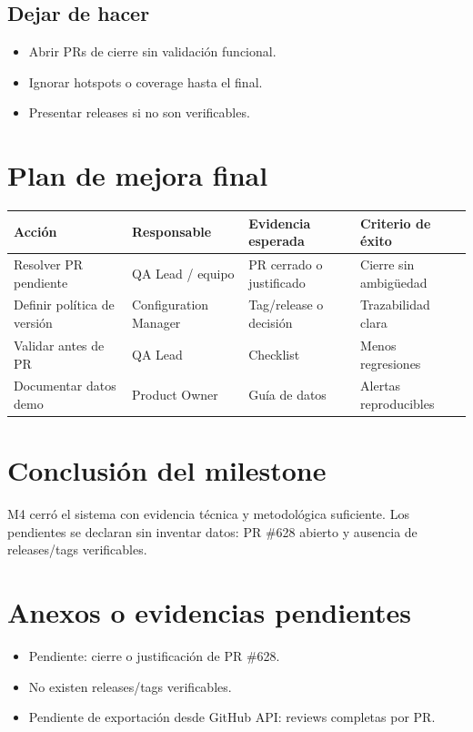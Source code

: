 \documentclass[11pt,a4paper]{article}
\begin{document}
\subsection{Dejar de hacer}
\begin{itemize}
\item Abrir PRs de cierre sin validación funcional.
\item Ignorar hotspots o coverage hasta el final.
\item Presentar releases si no son verificables.
\end{itemize}

\section{Plan de mejora final}
\begin{tabularx}{\linewidth}{Y Y Y Y}
\toprule
Acción & Responsable & Evidencia esperada & Criterio de éxito\\
\midrule
Resolver PR pendiente & QA Lead / equipo & PR cerrado o justificado & Cierre sin ambigüedad\\
Definir política de versión & Configuration Manager & Tag/release o decisión & Trazabilidad clara\\
Validar antes de PR & QA Lead & Checklist & Menos regresiones\\
Documentar datos demo & Product Owner & Guía de datos & Alertas reproducibles\\
\bottomrule
\end{tabularx}

\section{Conclusión del milestone}
M4 cerró el sistema con evidencia técnica y metodológica suficiente. Los pendientes se declaran sin inventar datos: PR \#628 abierto y ausencia de releases/tags verificables.

\section{Anexos o evidencias pendientes}
\begin{itemize}
\item Pendiente: cierre o justificación de PR \#628.
\item No existen releases/tags verificables.
\item Pendiente de exportación desde GitHub API: reviews completas por PR.
\end{itemize}
\end{document}
